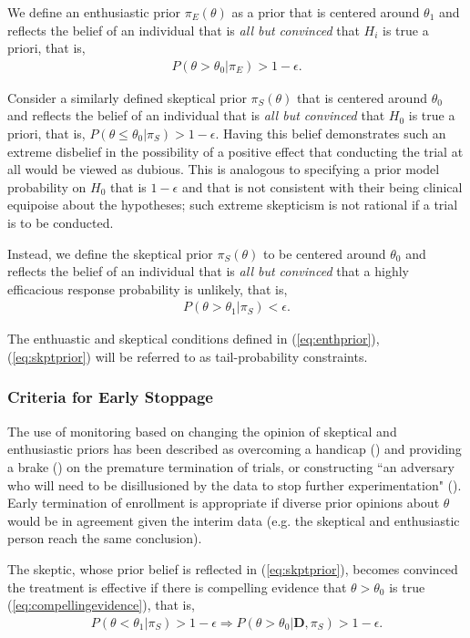 \documentclass[12pt]{article}
\begin{document}
We define an enthusiastic prior $\pi_{E}(\theta)$ as a prior that is centered around $\theta_1$ and reflects the belief of an individual that is \textit{all but convinced} that $H_i$ is true a priori, that is, 
\begin{align}\label{eq:enthprior}
P(\theta >\theta_0| \pi_{E})>1-\epsilon.
\end{align} 

Consider a similarly defined skeptical prior $\pi_{S}(\theta)$ that is centered around $\theta_0$ and reflects the belief of an individual that is \textit{all but convinced} that $H_0$ is true a priori, that is, $P(\theta\leq\theta_0| \pi_{S})>1-\epsilon$. Having this belief demonstrates such an extreme disbelief in the possibility of a positive effect that conducting the trial at all would be viewed as dubious. This is analogous to specifying a prior model probability on $H_0$ that is $1-\epsilon$ and that is not consistent with their being clinical equipoise about the hypotheses; such extreme skepticism is not rational if a trial is to be conducted. 

Instead, we define the skeptical prior $\pi_S(\theta)$ to be centered around $\theta_0$ and reflects the belief of an individual that is \textit{all but convinced} that a highly efficacious response probability is unlikely, that is,  
\begin{align}\label{eq:skptprior}
P(\theta>\theta_1| \pi_{S})<\epsilon.
\end{align}

The enthuastic and skeptical conditions defined in (\ref{eq:enthprior}), (\ref{eq:skptprior}) will be referred to as tail-probability constraints.

\subsubsection{Criteria for Early Stoppage}
The use of monitoring based on changing the opinion of skeptical and enthusiastic priors has been described as overcoming a handicap (\cite{Freedman1989}) and providing a brake (\cite{Fayers1997}) on the premature termination of trials, or constructing ``an adversary who will need to be disillusioned by the data to stop further experimentation" (\cite{Spiegelhalter1994}). Early termination of enrollment is appropriate if diverse prior opinions about $\theta$ would be in agreement given the interim data (e.g. the skeptical and enthusiastic person reach the same conclusion). 

The skeptic, whose prior belief is reflected in (\ref{eq:skptprior}), becomes convinced the treatment is effective if there is compelling evidence that $\theta>\theta_0$ is true (\ref{eq:compellingevidence}), that is, 
\begin{align}
P(\theta<\theta_1|\pi_{S})>1-\epsilon \Rightarrow P(\theta>\theta_0| \mathbf{D},\pi_{S})>1-\epsilon.
\end{align}
\end{document}
